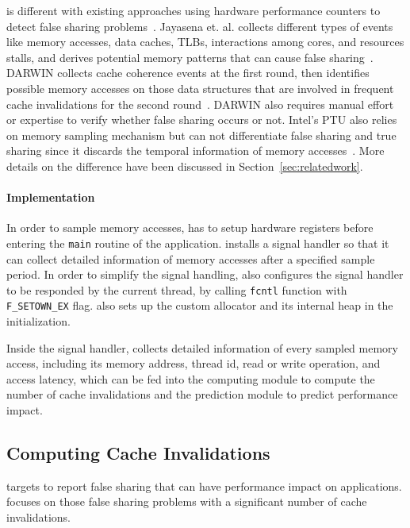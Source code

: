 \cheetah{} is different with existing approaches using hardware performance counters to detect false sharing problems~\cite{mldetect, openmp, detect:ptu}. Jayasena et. al. collects different types of events like memory accesses, data caches, TLBs, interactions among cores, and resources stalls, and derives potential memory patterns that can cause false sharing~\cite{mldetect}. DARWIN collects cache coherence events at the first round, then identifies possible memory accesses on those data structures that are involved in frequent cache invalidations for the second round~\cite{openmp}. DARWIN also requires manual effort or expertise to verify whether false sharing occurs or not.  Intel's PTU also relies on memory sampling mechanism but can not differentiate false sharing and true sharing since it discards the temporal information of memory accesses~\cite{detect:ptu}. More details on the difference have been discussed in Section~\ref{sec:relatedwork}.

\paragraph{Implementation} 
In order to sample memory accesses, \cheetah{} has to setup hardware registers before entering the \texttt{main} routine of the application.  \Cheetah{} installs a signal handler so that it can collect detailed information of memory accesses after a specified sample period. In order to simplify the signal handling, \Cheetah{} also configures the signal handler to be responded by the current thread, by calling \texttt{fcntl} function with \texttt{F\_SETOWN\_EX} flag. \cheetah{} also sets up the custom allocator and its internal heap in the initialization.

Inside the signal handler, \Cheetah{} collects detailed information of every sampled memory access, including its memory address, thread id, read or write operation, and access latency, which can be fed into the computing module to compute the number of cache invalidations and the prediction module to predict performance impact.


\subsection{Computing Cache Invalidations}
\label{sec:computeinvalidations}

\Cheetah{} targets to report false sharing that can have performance impact on applications. \Cheetah{} focuses on those false sharing problems with a significant number of cache invalidations.  

